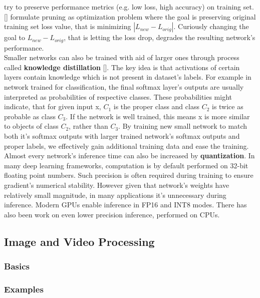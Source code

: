 \documentclass[../Main.tex]{subfiles}
\begin{document}
    try to preserve performance metrics (e.g. low loss, high accuracy) on training set. 
    [\cite{molchanov2016pruning}] formulate pruning as optimization problem where
    the goal is preserving original training set loss value, that is minimizing
    $|L_{new} - L_{orig}|$. Curiously changing the goal to $L_{new} - L_{orig}$,
    that is letting the loss drop, degrades the resulting network's performance.\\
    Smaller networks can also be trained with aid of larger ones through process called
    \textbf{knowledge distillation} [\cite{hinton2015distilling}]. 
    The key idea is that activations of certain layers
    contain knowledge which is not present in dataset's labels. For example in network 
    trained for classification, the final softmax layer's outputs are usually 
    interpreted as probabilities of respective classes. These probabilities might indicate,
    that for given input x, $C_1$ is the proper class and class $C_2$ is twice as probable 
    as class $C_3$. If the network is well trained, this means x is more similar to
    objects of class $C_2$, rather than $C_3$. By training new small network to match both
    it's softmax outputs with larger trained network's softmax outputs and proper labels,
    we effectively gain additional training data and ease the training.
    Almost every network's inference time can also be increased by \textbf{quantization}.
    In many deep learning frameworks, computation is by default performed on
    32-bit floating point numbers. Such precision is often required during training to 
    ensure gradient's numerical stability. However given that network's weights have
    relatively small magnitude, in many applications it's unnecessary during inference.
    Modern GPUs enable inference in FP16 and INT8 modes. There has also been work 
    on even lower precision inference, performed on CPUs. 
    
    

\subsection{Image and Video Processing}
    \subsubsection{Basics}
    \subsubsection{Examples}


\biblio %
\end{document}

